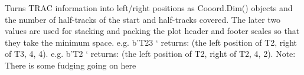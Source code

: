 \documentclass[letterpaper,10pt,english]{sphinxmanual}
\begin{document}
\begin{fulllineitems}
\begin{fulllineitems}
\label{\detokenize{ref/util/plot/FILMCfgXML:TotalDepth.util.plot.FILMCfgXML.PhysFilmCfgXMLRead.interpretTrac}}
Turns TRAC information into left/right positions as Cooord.Dim()
objects and the number of half-tracks of the start and half-tracks
covered. The later two values are used for stacking and packing the
plot header and footer scales so that they take the minimum space.
e.g. b’T23 ‘ returns:
(the left position of T2, right of T3, 4, 4).
e.g. b’T2 ‘ returns:
(the left position of T2, right of T2, 4, 2).
Note: There is some fudging going on here

\end{fulllineitems}


\end{fulllineitems}

\end{document}
